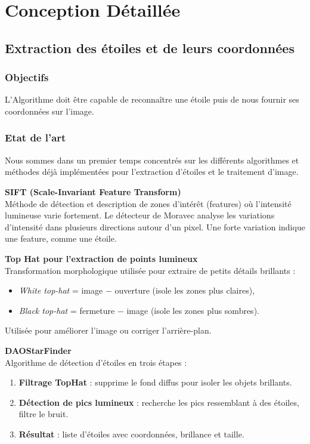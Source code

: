 \section{Conception Détaillée}

\subsection{Extraction des étoiles et de leurs coordonnées}

\subsubsection{Objectifs}

L'Algorithme doit être capable de reconnaître une étoile puis de nous fournir ses coordonnées sur l'image.

\subsubsection{Etat de l'art}

Nous sommes dans un premier temps concentrés sur les différents algorithmes et méthodes déjà implémentées pour l'extraction d'étoiles et le traitement d'image.

\vspace{0.5cm}

\noindent \textbf{SIFT (Scale-Invariant Feature Transform)}\\
Méthode de détection et description de zones d’intérêt (features) où l’intensité lumineuse varie fortement. Le détecteur de Moravec analyse les variations d’intensité dans plusieurs directions autour d’un pixel. Une forte variation indique une feature, comme une étoile.

\vspace{0.5em}
\noindent \textbf{Top Hat pour l’extraction de points lumineux}\\
Transformation morphologique utilisée pour extraire de petits détails brillants :
\begin{itemize}[noitemsep]
    \item \textit{White top-hat} = image $-$ ouverture (isole les zones plus claires),
    \item \textit{Black top-hat} = fermeture $-$ image (isole les zones plus sombres).
\end{itemize}
Utilisée pour améliorer l’image ou corriger l’arrière-plan.

\vspace{0.5em}
\noindent \textbf{DAOStarFinder}\\
Algorithme de détection d’étoiles en trois étapes :
\begin{enumerate}[noitemsep]
    \item \textbf{Filtrage TopHat} : supprime le fond diffus pour isoler les objets brillants.
    \item \textbf{Détection de pics lumineux} : recherche les pics ressemblant à des étoiles, filtre le bruit.
    \item \textbf{Résultat} : liste d’étoiles avec coordonnées, brillance et taille.
\end{enumerate}


